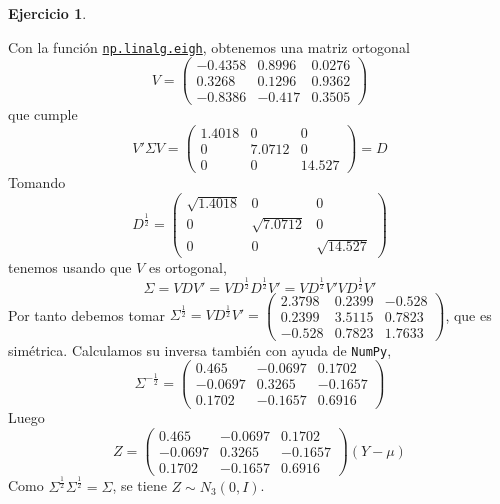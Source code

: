 \documentclass[12pt,spanish]{article}
\theoremstyle{definition}
\newtheorem{exercise}{Ejercicio}
\begin{document}
\begin{exercise}
\begin{enumerate}[a)]
      Con la función
      \href{https://numpy.org/doc/stable/reference/generated/numpy.linalg.eigh.html}{\texttt{np.linalg.eigh}},
      obtenemos una matriz ortogonal
      \[V=
        \begin{pmatrix}
          -0.4358 & 0.8996 & 0.0276 \\
          0.3268 & 0.1296 & 0.9362 \\
          -0.8386 & -0.417 & 0.3505
        \end{pmatrix}
      \] que cumple \[V'\Sigma V=
        \begin{pmatrix}
          1.4018 & 0 & 0 \\
          0 & 7.0712 & 0 \\
          0 & 0 & 14.527
        \end{pmatrix}=D\]
      Tomando \[D^\frac{1}{2}=
      \begin{pmatrix}
          \sqrt{1.4018} & 0 & 0 \\
          0 & \sqrt{7.0712} & 0 \\
          0 & 0 & \sqrt{14.527}
        \end{pmatrix}\]
      tenemos usando que $V$ es ortogonal,
      \[\Sigma=VDV'=VD^\frac{1}{2}D^\frac{1}{2}V'=VD^\frac{1}{2}V'VD^\frac{1}{2}V'\]
      Por tanto debemos tomar $\Sigma^\frac{1}{2}=VD^\frac{1}{2}V'=
      \begin{pmatrix}
        2.3798 & 0.2399 & -0.528 \\
        0.2399 & 3.5115 & 0.7823 \\
        -0.528 & 0.7823 & 1.7633
      \end{pmatrix}$, que es simétrica. Calculamos su inversa también
      con ayuda de \texttt{NumPy},
      \[\Sigma^{-\frac{1}{2}}=
        \begin{pmatrix}
          0.465 & -0.0697 & 0.1702 \\
          -0.0697 & 0.3265 & -0.1657 \\
          0.1702 & -0.1657 & 0.6916
        \end{pmatrix}\]
        Luego \[Z=\begin{pmatrix}
          0.465 & -0.0697 & 0.1702 \\
          -0.0697 & 0.3265 & -0.1657 \\
          0.1702 & -0.1657 & 0.6916
        \end{pmatrix}\left(Y-\mu\right)\]
      Como $\Sigma^\frac{1}{2}\Sigma^\frac{1}{2}=\Sigma$, se tiene $Z\sim N_3(0,I)$.
    \end{enumerate}
    
\end{exercise}
\end{document}
